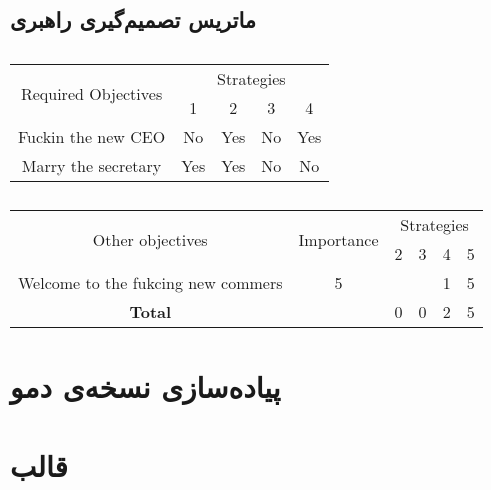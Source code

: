 \documentclass[11pt, oneside]{book}
\begin{document}
\section{ماتریس تصمیم‌گیری راهبری}
\begin{table}[H]\caption{}
    \begin{latin}
        \begin{center}
            \begin{tabular}{|c|c|c|c|c|}
                    \hline
                    \multirow{2}{*}{Required Objectives}
                     & \multicolumn{4}{|c|}{Strategies} \\
                     \cline{2-5}
                    & 1 & 2 & 3 & 4 \\
                    \hline
                    Fuckin the new CEO & No & Yes & No & Yes \\
                    \hline
                    Marry the secretary & Yes & Yes & No & No \\
                    \hline
            \end{tabular}
        \end{center}
    \end{latin}
\end{table}

\begin{table}[H]\caption{}
    \begin{latin}
        \begin{center}
            \begin{tabular}{|c|c|c|c|c|c|}
                \hline
                \multirow{2}{*}{Other objectives} &
                \multirow{2}{*}{Importance} &
                \multicolumn{4}{|c|}{Strategies}\\
                \cline{3-6}
                & & 2 & 3 & 4 & 5 \\
                \hline
                Welcome to the fukcing new commers &
                5 & 
                &
                &
                1
                &
                5 \\
                \hline
                \textbf{Total} & & 0& 0 & 2 & 5 \\
                \hline
            \end{tabular}
        \end{center}
    \end{latin}
\end{table}
\chapter{پیاده‌سازی نسخه‌ی دمو}
\chapter{قالب }
\end{document}
